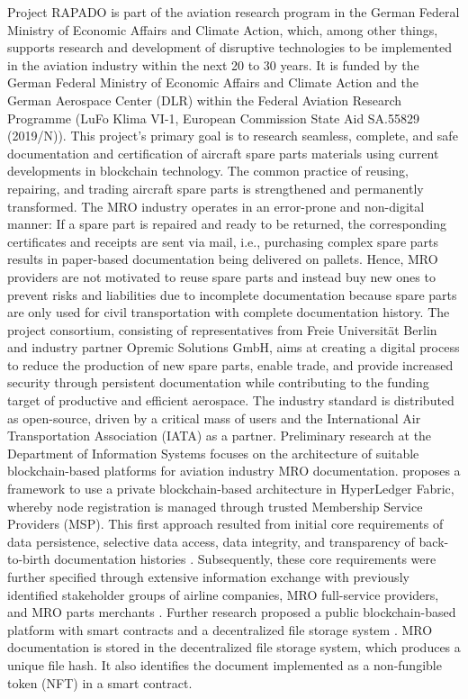 Project RAPADO is part of the aviation research program in the German Federal Ministry of Economic Affairs and Climate Action, which, among other things, supports research and development of disruptive technologies to be implemented in the aviation industry within the next 20 to 30 years. It is funded by the German Federal Ministry of Economic Affairs and Climate Action and the German Aerospace Center (DLR) within the Federal Aviation Research Programme (LuFo Klima VI-1, European Commission State Aid SA.55829 (2019/N)). This project's primary goal is to research seamless, complete, and safe documentation and certification of aircraft spare parts materials using current developments in blockchain technology. The common practice of reusing, repairing, and trading aircraft spare parts is strengthened and permanently transformed. The MRO industry operates in an error-prone and non-digital manner: If a spare part is repaired and ready to be returned, the corresponding certificates and receipts are sent via mail, i.e., purchasing complex spare parts results in paper-based documentation being delivered on pallets. Hence, MRO providers are not motivated to reuse spare parts and instead buy new ones to prevent risks and liabilities due to incomplete documentation because spare parts are only used for civil transportation with complete documentation history. The project consortium, consisting of representatives from Freie Universit{\"a}t Berlin and industry partner Opremic Solutions GmbH, aims at creating a digital process to reduce the production of new spare parts, enable trade, and provide increased security through persistent documentation while contributing to the funding target of productive and efficient aerospace. The industry standard is distributed as open-source, driven by a critical mass of users and the International Air Transportation Association (IATA) as a partner.
Preliminary research at the Department of Information Systems focuses on the architecture of suitable blockchain-based platforms for aviation industry MRO documentation. \citet{WickboldtMeiseKliewer} proposes a framework to use a private blockchain-based architecture in HyperLedger Fabric, whereby node registration is managed through trusted Membership Service Providers (MSP). This first approach resulted from initial core requirements of data persistence, selective data access, data integrity, and transparency of back-to-birth documentation histories \citep{WickboldtClemens2018BzdD}. Subsequently, these core requirements were further specified through extensive information exchange with previously identified stakeholder groups of airline companies, MRO full-service providers, and MRO parts merchants \citep{ZedelJ}. Further research proposed a public blockchain-based platform with smart contracts and a decentralized file storage system \citep{ZedelJ}. MRO documentation is stored in the decentralized file storage system, which produces a unique file hash. It also identifies the document implemented as a non-fungible token (NFT) in a smart contract.

